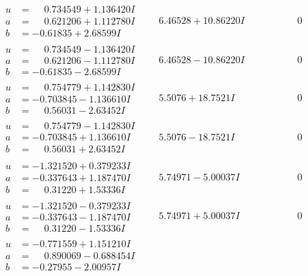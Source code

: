 \documentclass[1p]{elsarticle_modified}
\theoremstyle{definition}
\begin{document}
$$\begin{array}{c|c|c}
\begin{aligned}
u &= \phantom{-}0.734549 + 1.136420 I \\
a &= \phantom{-}0.621206 + 1.112780 I \\
b &= -0.61835 + 2.68599 I\end{aligned}
 & \phantom{-}6.46528 + 10.86220 I & \phantom{-0.000000 } 0 \\ \hline\begin{aligned}
u &= \phantom{-}0.734549 - 1.136420 I \\
a &= \phantom{-}0.621206 - 1.112780 I \\
b &= -0.61835 - 2.68599 I\end{aligned}
 & \phantom{-}6.46528 - 10.86220 I & \phantom{-0.000000 } 0 \\ \hline\begin{aligned}
u &= \phantom{-}0.754779 + 1.142830 I \\
a &= -0.703845 - 1.136610 I \\
b &= \phantom{-}0.56031 - 2.63452 I\end{aligned}
 & \phantom{-}5.5076 + 18.7521 I & \phantom{-0.000000 } 0 \\ \hline\begin{aligned}
u &= \phantom{-}0.754779 - 1.142830 I \\
a &= -0.703845 + 1.136610 I \\
b &= \phantom{-}0.56031 + 2.63452 I\end{aligned}
 & \phantom{-}5.5076 - 18.7521 I & \phantom{-0.000000 } 0 \\ \hline\begin{aligned}
u &= -1.321520 + 0.379233 I \\
a &= -0.337643 + 1.187470 I \\
b &= \phantom{-}0.31220 + 1.53336 I\end{aligned}
 & \phantom{-}5.74971 - 5.00037 I & \phantom{-0.000000 } 0 \\ \hline\begin{aligned}
u &= -1.321520 - 0.379233 I \\
a &= -0.337643 - 1.187470 I \\
b &= \phantom{-}0.31220 - 1.53336 I\end{aligned}
 & \phantom{-}5.74971 + 5.00037 I & \phantom{-0.000000 } 0 \\ \hline\begin{aligned}
u &= -0.771559 + 1.151210 I \\
a &= \phantom{-}0.890069 - 0.688454 I \\
b &= -0.27955 - 2.00957 I\end{aligned}

\end{array}$$
\end{document}
